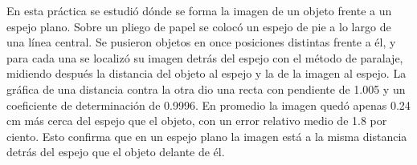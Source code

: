 En esta práctica se estudió dónde se forma la imagen de un objeto frente a un espejo plano. Sobre un pliego de papel se colocó un espejo de pie a lo largo de una línea central. Se pusieron objetos en once posiciones distintas frente a él, y para cada una se localizó su imagen detrás del espejo con el método de paralaje, midiendo después la distancia del objeto al espejo y la de la imagen al espejo. La gráfica de una distancia contra la otra dio una recta con pendiente de 1.005 y un coeficiente de determinación de 0.9996. En promedio la imagen quedó apenas 0.24 cm más cerca del espejo que el objeto, con un error relativo medio de 1.8 por ciento. Esto confirma que en un espejo plano la imagen está a la misma distancia detrás del espejo que el objeto delante de él.

